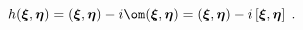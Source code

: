 \begin{equation}
h({\boldsymbol \xi},{\boldsymbol \eta}) = 
	\left({\boldsymbol\xi},{\boldsymbol \eta}\right) - i 
		{\boldsymbol \om}({\boldsymbol\xi},{\boldsymbol \eta}) =   
\left({\boldsymbol \xi},{\boldsymbol\eta} \right) 
	- i \left[ {\boldsymbol \xi},{\boldsymbol \eta} \right] \; .
\end{equation} 
